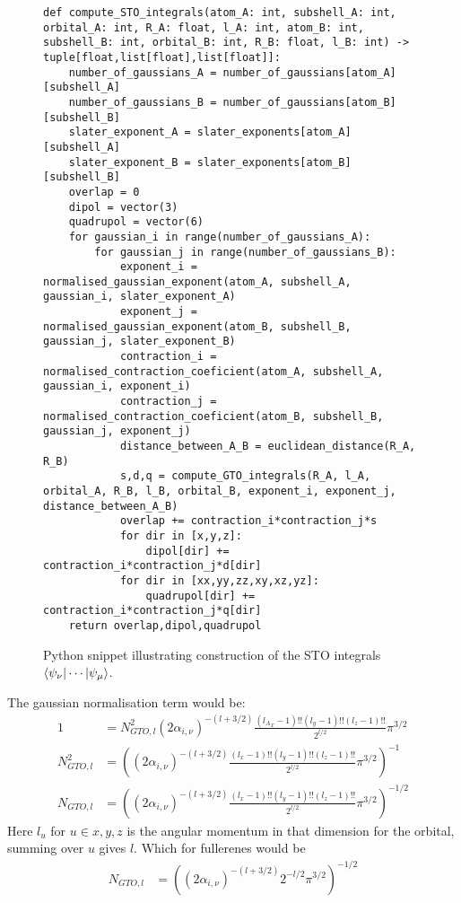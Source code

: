 \begin{figure}[H]
\begin{verbatim}
def compute_STO_integrals(atom_A: int, subshell_A: int, orbital_A: int, R_A: float, l_A: int, atom_B: int, subshell_B: int, orbital_B: int, R_B: float, l_B: int) -> tuple[float,list[float],list[float]]:
    number_of_gaussians_A = number_of_gaussians[atom_A][subshell_A]
    number_of_gaussians_B = number_of_gaussians[atom_B][subshell_B]
    slater_exponent_A = slater_exponents[atom_A][subshell_A]
    slater_exponent_B = slater_exponents[atom_B][subshell_B]
    overlap = 0
    dipol = vector(3)
    quadrupol = vector(6)
    for gaussian_i in range(number_of_gaussians_A):
        for gaussian_j in range(number_of_gaussians_B):
            exponent_i = normalised_gaussian_exponent(atom_A, subshell_A, gaussian_i, slater_exponent_A)
            exponent_j = normalised_gaussian_exponent(atom_B, subshell_B, gaussian_j, slater_exponent_B)
            contraction_i = normalised_contraction_coeficient(atom_A, subshell_A, gaussian_i, exponent_i)
            contraction_j = normalised_contraction_coeficient(atom_B, subshell_B, gaussian_j, exponent_j)
            distance_between_A_B = euclidean_distance(R_A, R_B)
            s,d,q = compute_GTO_integrals(R_A, l_A, orbital_A, R_B, l_B, orbital_B, exponent_i, exponent_j, distance_between_A_B)
            overlap += contraction_i*contraction_j*s
            for dir in [x,y,z]:
                dipol[dir] += contraction_i*contraction_j*d[dir]
            for dir in [xx,yy,zz,xy,xz,yz]:
                quadrupol[dir] += contraction_i*contraction_j*q[dir]
    return overlap,dipol,quadrupol
\end{verbatim}
    \caption{Python snippet illustrating construction of the STO integrals $\braket{\psi_\nu|\cdots|\psi_\mu}$.}
\end{figure}

The gaussian normalisation term would be:
\begin{align}
    1&=N_{GTO,l}^2(2\alpha_{i,\nu})^{-(l+3/2)}\frac{({l_A}_x-1)!!({l}_y-1)!!({l}_z-1)!!}{2^{l/2}}\pi^{3/2}\\
    N_{GTO,l}^2&=\left((2\alpha_{i,\nu})^{-(l+3/2)}\frac{({l}_x-1)!!({l}_y-1)!!({l}_z-1)!!}{2^{l/2}}\pi^{3/2}\right)^{-1}\\
    N_{GTO,l}&=\left((2\alpha_{i,\nu})^{-(l+3/2)}\frac{({l}_x-1)!!({l}_y-1)!!({l}_z-1)!!}{2^{l/2}}\pi^{3/2}\right)^{-1/2}
\end{align}
Here $l_u$ for $u\in x,y,z$ is the angular momentum in that dimension for the orbital, summing over $u$ gives $l$.
Which for fullerenes would be 
\begin{align}
    N_{GTO,l}&=\left((2\alpha_{i,\nu})^{-(l+3/2)}2^{-l/2}\pi^{3/2}\right)^{-1/2}
\end{align}

